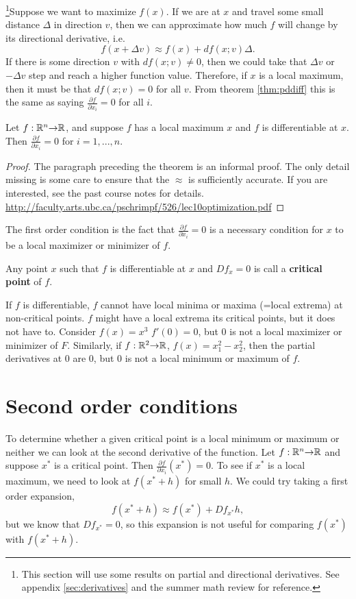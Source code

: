 \footnote{This section will use some results on partial and
  directional derivatives. See appendix \ref{sec:derivatives} and the
  summer math review for reference.}Suppose we want to maximize
$f(x)$. If we are at $x$ and travel some small distance $\Delta$ in
direction $v$, then we can approximate how much $f$ will change by
its directional derivative, i.e.\
\[ f(x + \Delta v) \approx f(x) + df(x;v) \Delta. \]
If there is some direction $v$ with $df(x;v) \neq 0$, then we could
take that $\Delta v$ or $-\Delta v$ step and reach a higher function
value. Therefore, if $x$ is a local maximum, then it must be that
$df(x;v) = 0$ for all $v$. From theorem \ref{thm:pddiff} this is the
same as saying $\frac{\partial f}{\partial x_i} = 0$ for all $i$.
\begin{theorem}
  Let $f: \mathbb{R}^n {\rightarrow} \mathbb{R}$,  and suppose $f$ has a local
  maximum $x$ and $f$ is differentiable at $x$. Then $\frac{\partial
    f}{\partial x_i} = 0$ for $i = 1, ..., n$.
\end{theorem}
\begin{proof}
  The paragraph preceding the theorem is an informal proof. The only
  detail missing is some care to ensure that the $\approx$ is
  sufficiently accurate. If you are interested, see the past course
  notes for
  details. \url{http://faculty.arts.ubc.ca/pschrimpf/526/lec10optimization.pdf}
\end{proof}
The first order condition is the fact that $\frac{\partial f}{\partial
  x_i}= 0$ is a necessary condition for $x$ to be a local maximizer
or minimizer of $f$.
\begin{definition}
  Any point $x$ such that $f$ is differentiable at $x$ and
  $Df_x = 0$ is call a \textbf{critical
    point} of $f$.
\end{definition}
If $f$ is differentiable, $f$ cannot have local minima or maxima
(=local extrema) at non-critical points. $f$ might have a local
extrema its critical points, but it does not have to. Consider $f(x) =
x^3$ $f'(0) = 0$, but $0$ is not a local maximizer or minimizer of
$F$. Similarly, if $f:\mathbb{R}^2 {\rightarrow} \mathbb{R}$, $f(x) = x_1^2 - x_2^2$, then the
partial derivatives at $0$ are $0$, but $0$ is not a local minimum or
maximum of $f$.

\section{Second order conditions}

To determine whether a given critical point is a local minimum or
maximum or neither we can look at the second derivative of the
function. Let $f:\mathbb{R}^n {\rightarrow} \mathbb{R}$ and suppose $x^*$ is a critical
point. Then $\frac{\partial f}{\partial x_i}(x^*) = 0$. To see if
$x^*$ is a local maximum, we need to look at $f(x^* + h)$ for small
$h$. We could try taking a first order expansion,
\[ f(x^* + h) \approx f(x^*) + Df_{x^*} h, \]
but we know that $Df_{x^*} = 0$, so this expansion is not useful for
comparing $f(x^*)$ with $f(x^* + h)$. 

